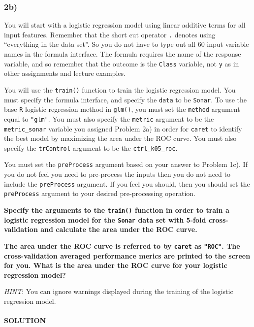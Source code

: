 \documentclass[
]{article}
\begin{document}
\hypertarget{b-1}{%
\subsubsection{2b)}\label{b-1}}

You will start with a logistic regression model using linear additive
terms for all input features. Remember that the short cut operator
\texttt{.} denotes using ``everything in the data set''. So you do not
have to type out all 60 input variable names in the formula interface.
The formula requires the name of the response variable, and so remember
that the outcome is the \texttt{Class} variable, not \texttt{y} as in
other assignments and lecture examples.

You will use the \texttt{train()} function to train the logistic
regression model. You must specify the formula interface, and specify
the \texttt{data} to be \texttt{Sonar}. To use the base \texttt{R}
logistic regression method in \texttt{glm()}, you must set the
\texttt{method} argument equal to \texttt{"glm"}. You must also specify
the \texttt{metric} argument to be the \texttt{metric\_sonar} variable
you assigned Problem 2a) in order for \texttt{caret} to identify the
best model by maximizing the area under the ROC curve. You must also
specify the \texttt{trControl} argument to be the
\texttt{ctrl\_k05\_roc}.

You must set the \texttt{preProcess} argument based on your answer to
Problem 1c). If you do not feel you need to pre-process the inputs then
you do not need to include the \texttt{preProcess} argument. If you feel
you should, then you should set the \texttt{preProcess} argument to your
desired pre-processing operation.

\textbf{Specify the arguments to the \texttt{train()} function in order
to train a logistic regression model for the \texttt{Sonar} data set
with 5-fold cross-validation and calculate the area under the ROC
curve.}

\textbf{The area under the ROC curve is referred to by \texttt{caret} as
\texttt{"ROC"}. The cross-validation averaged performance merics are
printed to the screen for you. What is the area under the ROC curve for
your logistic regression model?}

\emph{HINT}: You can ignore warnings displayed during the training of
the logistic regression model.

\hypertarget{solution-6}{%
\paragraph{SOLUTION}\label{solution-6}}
\end{document}
